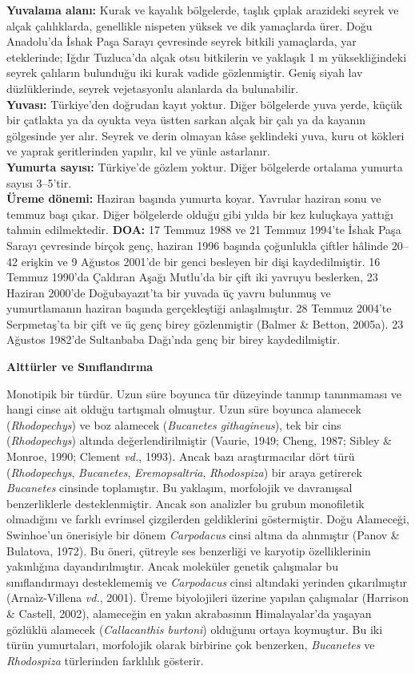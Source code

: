 \documentclass[
  10.5pt,
  a4paper,
  DIV=11,
  numbers=noendperiod,
  twocolumn]{scrreprt}
\begin{document}
\textbf{Yuvalama alanı:} Kurak ve kayalık bölgelerde, taşlık çıplak
arazideki seyrek ve alçak çalılıklarda, genellikle nispeten yüksek ve
dik yamaçlarda ürer. Doğu Anadolu'da İshak Paşa Sarayı çevresinde seyrek
bitkili yamaçlarda, yar eteklerinde; Iğdır Tuzluca'da alçak otsu
bitkilerin ve yaklaşık 1 m yüksekliğindeki seyrek çalıların bulunduğu
iki kurak vadide gözlenmiştir. Geniş siyah lav düzlüklerinde, seyrek
vejetasyonlu alanlarda da bulunabilir.\\
\textbf{Yuvası:} Türkiye'den doğrudan kayıt yoktur. Diğer bölgelerde
yuva yerde, küçük bir çatlakta ya da oyukta veya üstten sarkan alçak bir
çalı ya da kayanın gölgesinde yer alır. Seyrek ve derin olmayan kâse
şeklindeki yuva, kuru ot kökleri ve yaprak şeritlerinden yapılır, kıl ve
yünle astarlanır.\\
\textbf{Yumurta sayısı:} Türkiye'de gözlem yoktur. Diğer bölgelerde
ortalama yumurta sayısı 3--5'tir.\\
\textbf{Üreme dönemi:} Haziran başında yumurta koyar. Yavrular haziran
sonu ve temmuz başı çıkar. Diğer bölgelerde olduğu gibi yılda bir kez
kuluçkaya yattığı tahmin edilmektedir. \textbf{DOA:} 17 Temmuz 1988 ve
21 Temmuz 1994'te İshak Paşa Sarayı çevresinde birçok genç, haziran 1996
başında çoğunlukla çiftler hâlinde 20--42 erişkin ve 9 Ağustos 2001'de
bir genci besleyen bir dişi kaydedilmiştir. 16 Temmuz 1990'da Çaldıran
Aşağı Mutlu'da bir çift iki yavruyu beslerken, 23 Haziran 2000'de
Doğubayazıt'ta bir yuvada üç yavru bulunmuş ve yumurtlamanın haziran
başında gerçekleştiği anlaşılmıştır. 28 Temmuz 2004'te Serpmetaş'ta bir
çift ve üç genç birey gözlenmiştir (Balmer \& Betton, 2005a). 23 Ağustos
1982'de Sultanbaba Dağı'nda genç bir birey kaydedilmiştir.

\textbf{Alttürler ve Sınıflandırma}

Monotipik bir türdür. Uzun süre boyunca tür düzeyinde tanınıp
tanınmaması ve hangi cinse ait olduğu tartışmalı olmuştur. Uzun süre
boyunca alamecek (\emph{Rhodopechys}) ve boz alamecek (\emph{Bucanetes
githagineus}), tek bir cins (\emph{Rhodopechys}) altında
değerlendirilmiştir (Vaurie, 1949; Cheng, 1987; Sibley \& Monroe, 1990;
Clement \emph{vd.}, 1993). Ancak bazı araştırmacılar dört türü
(\emph{Rhodopechys}, \emph{Bucanetes}, \emph{Eremopsaltria},
\emph{Rhodospiza}) bir araya getirerek \emph{Bucanetes} cinsinde
toplamıştır. Bu yaklaşım, morfolojik ve davranışsal benzerliklerle
desteklenmiştir. Ancak son analizler bu grubun monofiletik olmadığını ve
farklı evrimsel çizgilerden geldiklerini göstermiştir. Doğu Alameceği,
Swinhoe'un önerisiyle bir dönem \emph{Carpodacus} cinsi altına da
alınmıştır (Panov \& Bulatova, 1972). Bu öneri, çütreyle ses benzerliği
ve karyotip özelliklerinin yakınlığına dayandırılmıştır. Ancak moleküler
genetik çalışmalar bu sınıflandırmayı desteklememiş ve \emph{Carpodacus}
cinsi altındaki yerinden çıkarılmıştır (Arnaìz-Villena \emph{vd.},
2001). Üreme biyolojileri üzerine yapılan çalışmalar (Harrison \&
Castell, 2002), alameceğin en yakın akrabasının Himalayalar'da yaşayan
gözlüklü alamecek (\emph{Callacanthis burtoni}) olduğunu ortaya
koymuştur. Bu iki türün yumurtaları, morfolojik olarak birbirine çok
benzerken, \emph{Bucanetes} ve \emph{Rhodospiza} türlerinden farklılık
gösterir.
\end{document}

